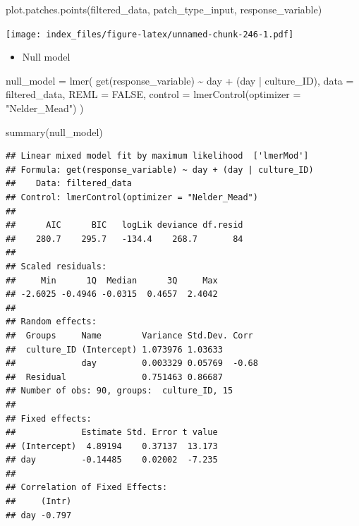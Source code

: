 \documentclass[
]{article}
\newenvironment{Shaded}{\begin{snugshade}}{\end{snugshade}}
\newcommand{\AttributeTok}[1]{\textcolor[rgb]{0.77,0.63,0.00}{#1}}
\newcommand{\ConstantTok}[1]{\textcolor[rgb]{0.00,0.00,0.00}{#1}}
\newcommand{\FunctionTok}[1]{\textcolor[rgb]{0.00,0.00,0.00}{#1}}
\newcommand{\NormalTok}[1]{#1}
\newcommand{\OtherTok}[1]{\textcolor[rgb]{0.56,0.35,0.01}{#1}}
\newcommand{\SpecialCharTok}[1]{\textcolor[rgb]{0.00,0.00,0.00}{#1}}
\newcommand{\StringTok}[1]{\textcolor[rgb]{0.31,0.60,0.02}{#1}}
\providecommand{\tightlist}{%
  \setlength{\itemsep}{0pt}\setlength{\parskip}{0pt}}
\begin{document}
\begin{Shaded}
\begin{Highlighting}[]
\FunctionTok{plot.patches.points}\NormalTok{(filtered\_data,}
\NormalTok{                    patch\_type\_input,}
\NormalTok{                    response\_variable)}
\end{Highlighting}
\end{Shaded}

\texttt{[image: index\_files/figure-latex/unnamed-chunk-246-1.pdf]}

\begin{itemize}
\tightlist
\item
  Null model
\end{itemize}

\begin{Shaded}
\begin{Highlighting}[]
\NormalTok{null\_model }\OtherTok{=} \FunctionTok{lmer}\NormalTok{(}
  \FunctionTok{get}\NormalTok{(response\_variable) }\SpecialCharTok{\textasciitilde{}}
\NormalTok{    day }\SpecialCharTok{+}
\NormalTok{    (day }\SpecialCharTok{|}\NormalTok{ culture\_ID),}
  \AttributeTok{data =}\NormalTok{ filtered\_data,}
  \AttributeTok{REML =} \ConstantTok{FALSE}\NormalTok{,}
  \AttributeTok{control =} \FunctionTok{lmerControl}\NormalTok{(}\AttributeTok{optimizer =} \StringTok{"Nelder\_Mead"}\NormalTok{)}
\NormalTok{)}

\FunctionTok{summary}\NormalTok{(null\_model)}
\end{Highlighting}
\end{Shaded}

\begin{verbatim}
## Linear mixed model fit by maximum likelihood  ['lmerMod']
## Formula: get(response_variable) ~ day + (day | culture_ID)
##    Data: filtered_data
## Control: lmerControl(optimizer = "Nelder_Mead")
## 
##      AIC      BIC   logLik deviance df.resid 
##    280.7    295.7   -134.4    268.7       84 
## 
## Scaled residuals: 
##     Min      1Q  Median      3Q     Max 
## -2.6025 -0.4946 -0.0315  0.4657  2.4042 
## 
## Random effects:
##  Groups     Name        Variance Std.Dev. Corr 
##  culture_ID (Intercept) 1.073976 1.03633       
##             day         0.003329 0.05769  -0.68
##  Residual               0.751463 0.86687       
## Number of obs: 90, groups:  culture_ID, 15
## 
## Fixed effects:
##             Estimate Std. Error t value
## (Intercept)  4.89194    0.37137  13.173
## day         -0.14485    0.02002  -7.235
## 
## Correlation of Fixed Effects:
##     (Intr)
## day -0.797
\end{verbatim}
\end{document}
